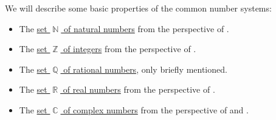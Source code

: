 We will describe some basic properties of the common number systems:
\begin{itemize}
  \item The \hyperref[def:set_of_natural_numbers]{set \( \BbbN \) of natural numbers} from the perspective of .
  \item The \hyperref[def:set_of_integers]{set \( \BbbZ \) of integers} from the perspective of .
  \item The \hyperref[def:set_of_rational_numbers]{set \( \BbbQ \) of rational numbers}, only briefly mentioned.
  \item The \hyperref[def:set_of_real_numbers]{set \( \BbbR \) of real numbers} from the perspective of .
  \item The \hyperref[def:set_of_real_numbers]{set \( \BbbC \) of complex numbers} from the perspective of  and .
\end{itemize}
